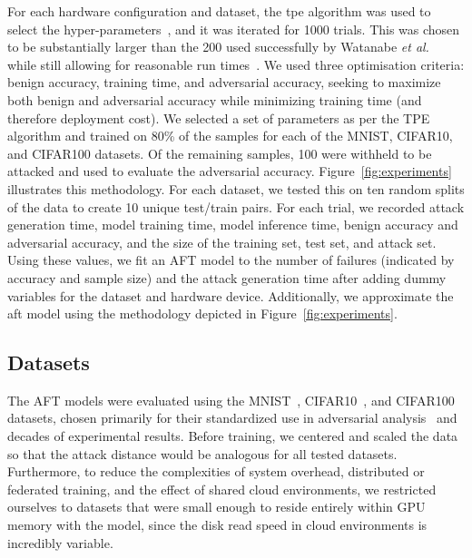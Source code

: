\documentclass[sn-mathphys-num]{sn-jnl}%
\begin{document}
For each hardware configuration and dataset, the \acrshort{tpe} algorithm was used to select the hyper-parameters~\cite{ozaki2020multiobjective,zitzler2008quality}, and it was iterated for 1000 trials. This was chosen to be substantially larger than the 200 used successfully by Watanabe \textit{et al.}~\cite{tpe_params} while still allowing for reasonable run times~\cite{legriel2010approximating}.
We used three optimisation criteria: benign accuracy, training time, and adversarial accuracy, seeking to maximize both benign and adversarial accuracy while minimizing training time (and therefore deployment cost). We selected a set of parameters as per the TPE algorithm and trained on 80\% of the samples for each of the MNIST, CIFAR10, and CIFAR100 datasets. Of the remaining samples, 100 were withheld to be attacked and used to evaluate the adversarial accuracy. Figure~\ref{fig:experiments} illustrates this methodology. For each dataset, we tested this on ten random splits of the data to create 10 unique test/train pairs. For each trial, we recorded attack generation time, model training time, model inference time, benign accuracy and adversarial accuracy, and the size of the training set, test set, and attack set. Using these values, we fit an AFT model to the number of failures (indicated by accuracy and sample size) and the attack generation time after adding dummy variables for the dataset and hardware device. Additionally, we approximate the \acrshort{aft} model using the methodology depicted in Figure~\ref{fig:experiments}.


\subsection{Datasets}

The AFT models were evaluated using the MNIST~\cite{mnist}, CIFAR10~\cite{cifar}, and CIFAR100~\cite{cifar} datasets, chosen primarily for their standardized use in adversarial analysis~\cite{madry2017towards,croce_reliable_2020,carlini_towards_2017,deepfool} and decades of experimental results.
Before training, we centered and scaled the data so that the attack distance would be analogous for all tested datasets. Furthermore, to reduce the complexities of system overhead, distributed or federated training, and the effect of shared cloud environments, we restricted ourselves to datasets that were small enough to reside entirely within GPU memory with the model, since the disk read speed in cloud environments is incredibly variable.
\end{document}
